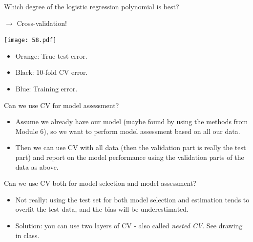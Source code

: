 \documentclass[
  10pt,
  ignorenonframetext,
]{beamer}
\providecommand{\tightlist}{%
  \setlength{\itemsep}{0pt}\setlength{\parskip}{0pt}}
\begin{document}
\begin{frame}
Which degree of the logistic regression polynomial is best?

\(\rightarrow\) Cross-validation!

\centering

\texttt{[image: 58.pdf]}

\flushleft

\begin{itemize}
\tightlist
\item
  Orange: True test error.
\item
  Black: 10-fold CV error.
\item
  Blue: Training error.
\end{itemize}
\end{frame}

\begin{frame}
\begin{block}{Can we use CV for model assessment?}
\protect\hypertarget{can-we-use-cv-for-model-assessment}{}
\vspace{2mm}

\begin{itemize}
\item
  Assume we already have our model (maybe found by using the methods
  from Module 6), so we want to perform model assessment based on all
  our data.
\item
  Then we can use CV with all data (then the validation part is really
  the test part) and report on the model performance using the
  validation parts of the data as above.
\end{itemize}

\vspace{2mm}
\end{block}

\begin{block}{Can we use CV both for model selection and model
assessment?}
\protect\hypertarget{can-we-use-cv-both-for-model-selection-and-model-assessment}{}
\vspace{2mm}

\begin{itemize}
\item
  Not really: using the test set for both model selection and estimation
  tends to overfit the test data, and the bias will be underestimated.
\item
  Solution: you can use two layers of CV - also called \emph{nested CV}.
  See drawing in class.
\end{itemize}
\end{block}
\end{frame}
\end{document}
